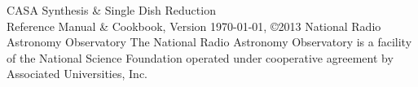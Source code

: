 
\begin{center}
{\sc CASA Synthesis \& Single Dish Reduction\\ Reference Manual \& Cookbook}, 
\break
Version \today,
\break
\copyright 2013 National Radio Astronomy Observatory
\break
\break
The National Radio Astronomy Observatory is a facility of the National
Science Foundation operated under cooperative agreement by Associated
Universities, Inc.\\[1cm]
\end{center}

%
%



\pagebreak
~
\pagebreak